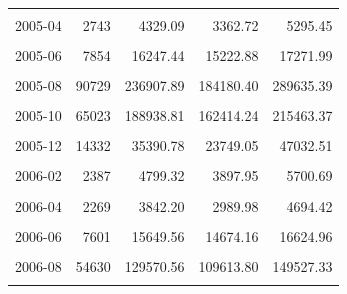 \begin{longtable}[t]{crrrr}
\cellcolor{gray!10}{2005-03} & \cellcolor{gray!10}{2528} & \cellcolor{gray!10}{4921.86} & \cellcolor{gray!10}{3559.13} & \cellcolor{gray!10}{6284.58}\\
2005-04 & 2743 & 4329.09 & 3362.72 & 5295.45\\
\cellcolor{gray!10}{2005-05} & \cellcolor{gray!10}{5075} & \cellcolor{gray!10}{9557.49} & \cellcolor{gray!10}{8823.22} & \cellcolor{gray!10}{10291.77}\\
2005-06 & 7854 & 16247.44 & 15222.88 & 17271.99\\
\cellcolor{gray!10}{2005-07} & \cellcolor{gray!10}{30238} & \cellcolor{gray!10}{32850.28} & \cellcolor{gray!10}{22631.25} & \cellcolor{gray!10}{43069.30}\\
2005-08 & 90729 & 236907.89 & 184180.40 & 289635.39\\
\cellcolor{gray!10}{2005-09} & \cellcolor{gray!10}{102455} & \cellcolor{gray!10}{323650.09} & \cellcolor{gray!10}{292565.33} & \cellcolor{gray!10}{354734.86}\\
2005-10 & 65023 & 188938.81 & 162414.24 & 215463.37\\
\cellcolor{gray!10}{2005-11} & \cellcolor{gray!10}{31631} & \cellcolor{gray!10}{82588.01} & \cellcolor{gray!10}{65439.43} & \cellcolor{gray!10}{99736.59}\\
2005-12 & 14332 & 35390.78 & 23749.05 & 47032.51\\
\cellcolor{gray!10}{2006-01} & \cellcolor{gray!10}{4531} & \cellcolor{gray!10}{10251.81} & \cellcolor{gray!10}{7748.65} & \cellcolor{gray!10}{12754.97}\\
2006-02 & 2387 & 4799.32 & 3897.95 & 5700.69\\
\cellcolor{gray!10}{2006-03} & \cellcolor{gray!10}{2426} & \cellcolor{gray!10}{4452.32} & \cellcolor{gray!10}{3052.95} & \cellcolor{gray!10}{5851.69}\\
2006-04 & 2269 & 3842.20 & 2989.98 & 4694.42\\
\cellcolor{gray!10}{2006-05} & \cellcolor{gray!10}{4313} & \cellcolor{gray!10}{8084.56} & \cellcolor{gray!10}{7493.53} & \cellcolor{gray!10}{8675.60}\\
2006-06 & 7601 & 15649.56 & 14674.16 & 16624.96\\
\cellcolor{gray!10}{2006-07} & \cellcolor{gray!10}{17788} & \cellcolor{gray!10}{24404.07} & \cellcolor{gray!10}{21123.83} & \cellcolor{gray!10}{27684.31}\\
2006-08 & 54630 & 129570.56 & 109613.80 & 149527.33\\
\cellcolor{gray!10}{2006-09} & \cellcolor{gray!10}{76475} & \cellcolor{gray!10}{222061.49} & \cellcolor{gray!10}{205455.79} & \cellcolor{gray!10}{238667.18}\\

\end{longtable}
